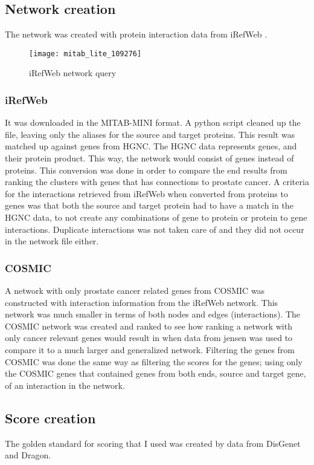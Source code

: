 \subsection{Network creation}
The network was created with protein interaction data from iRefWeb
\cite{irefweb}. 

\begin{figure}[H]
    \centering
    \caption{iRefWeb network query}
    \label{fig:irefweb}
    \texttt{[image: mitab\_lite\_109276]}
\end{figure}

\subsubsection{iRefWeb}
It was downloaded in the MITAB-MINI format. A python script cleaned up the file,
leaving only the aliases for the source and target proteins. This result was
matched up against genes from HGNC. The HGNC data represents genes, and their
protein product. This way, the network would consist of genes instead of
proteins. This conversion was done in order to compare the end results from
ranking the clusters with genes that has connections to prostate cancer.
A criteria for the interactions retrieved from iRefWeb when converted from
proteins to genes was that both the source and target protein had to have
a match in the HGNC data, to not create any combinations of gene to protein or
protein to gene interactions. Duplicate interactions was not taken care of and
they did not occur in the network file either.

\subsubsection{COSMIC}
A network with only prostate cancer related genes from
COSMIC\cite{cosmic-download} was constructed with interaction information from
the iRefWeb network. This network was much smaller in terms of both nodes and
edges (interactions). The COSMIC network was created and ranked to see how
ranking a network with only cancer relevant genes would result in when data from
jensen was used to compare it to a much larger and generalized network.
Filtering the genes from COSMIC was done the same way as filtering the scores
for the genes; using only the COSMIC genes that contained genes from both ends,
source and target gene, of an interaction in the network.

\subsection{Score creation}
The golden standard for scoring that I used was created by data from
DisGenet\cite{disgenet} and Dragon\cite{dragon}.

